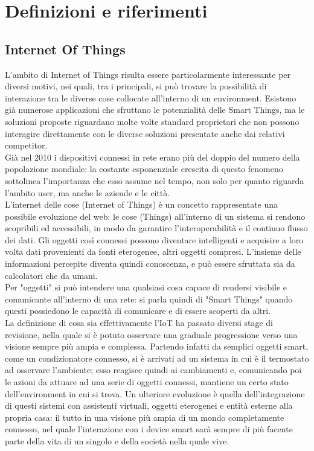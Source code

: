 \documentclass[12pt,a4paper,openright,oneside]{report}
\begin{document}
\clearpage{\pagestyle{empty}\cleardoublepage}
\chapter{Definizioni e riferimenti}

\section{Internet Of Things}
L'ambito di Internet of Things \cite{iot} risulta essere particolarmente interessante per diversi motivi, nei quali, tra i principali, si può trovare la possibilità di interazione tra le diverse cose collocate all'interno di un environment. Esistono già numerose applicazioni che sfruttano le potenzialità delle Smart Things, ma le soluzioni proposte riguardano molte volte standard proprietari che non possono interagire direttamente con le diverse soluzioni presentate anche dai relativi competitor.\\

Già nel 2010 i dispositivi connessi in rete erano più del doppio del numero della popolazione mondiale: la costante esponenziale crescita di questo fenomeno sottolinea l'importanza che esso assume nel tempo, non solo per quanto riguarda l'ambito user, ma anche le aziende e le città.\\

L'internet delle cose (Internet of Things) è un concetto rappresentate una possibile evoluzione del web: le cose (Things) all'interno di un sistema si rendono scopribili ed accessibili, in modo da garantire l'interoperabilità e il continuo flusso dei dati. Gli oggetti così connessi possono diventare intelligenti e acquisire a loro volta dati provenienti da fonti eterogenee, altri oggetti compresi. L'insieme delle informazioni percepite diventa quindi conoscenza, e può essere sfruttata sia da calcolatori che da umani.\\

Per "oggetti" \cite{smartthing} si può intendere una qualsiasi cosa capace di rendersi visibile e comunicante all'interno di una rete: si parla quindi di "Smart Things" quando questi possiedono le capacità di comunicare e di essere scoperti da altri.\\

La definizione di cosa sia effettivamente l'IoT ha passato diversi stage di revisione, nella quale si è potuto osservare una graduale progressione verso una visione sempre più ampia e complessa. Partendo infatti da semplici oggetti smart, come un condizionatore connesso, si è arrivati ad un sistema in cui è il termostato ad osservare l'ambiente; esso reagisce quindi ai cambiamenti e, comunicando poi le azioni da attuare ad una serie di oggetti connessi, mantiene un certo stato dell'environment in cui si trova. Un ulteriore evoluzione è quella dell'integrazione di questi sistemi con assistenti virtuali, oggetti eterogenei e entità esterne alla propria casa: il tutto in una visione più ampia di un mondo completamente connesso, nel quale l'interazione con i device smart sarà sempre di più facente parte della vita di un singolo e della società nella quale vive.\\
\end{document}
